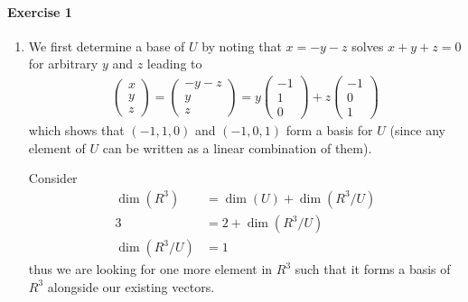\documentclass{article}
\begin{document}
\paragraph{Exercise 1}

\begin{enumerate}
    \item We first determine a base of $U$ by noting that $x = -y - z$ solves $x + y + z = 0$ for arbitrary $y$ and $z$ leading to
    \begin{align*}
        \begin{pmatrix}
            x \\ y \\ z
        \end{pmatrix}
        =
        \begin{pmatrix}
            -y - z \\ y \\ z
        \end{pmatrix}
        =
        y
        \begin{pmatrix}
            -1 \\ 1 \\ 0
        \end{pmatrix}
        +
        z
        \begin{pmatrix}
            -1 \\ 0 \\ 1
        \end{pmatrix}
    \end{align*}
    which shows that $(-1, 1, 0)$ and $(-1,0,1)$ form a basis for $U$ (since any element of $U$ can be written as a linear combination of them).

    Consider
    \begin{align*}
        \dim(R^3) &= \dim(U) + \dim(R^3/U) \\
        3 &= 2 + \dim(R^3/U) \\
        \dim(R^3/U) &= 1
    \end{align*}
    thus we are looking for one more element in $R^3$ such that it forms a basis of $R^3$ alongside our existing vectors.



\end{enumerate}
\end{document}
